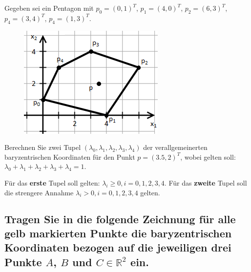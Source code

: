 \documentclass[a4paper,10pt,DIV=14]{scrartcl}
\begin{document}
Gegeben sei ein Pentagon mit $p_0 = (0, 1)^T$, $p_1 = (4, 0)^T$, $p_2 = (6, 3)^T$, $p_4 = (3, 4)^T$, $p_4 = (1, 3)^T$.
\begin{figure}[!htbp]
	\centering
	\includegraphics[]{simplex}
\end{figure}

Berechnen Sie zwei Tupel $(\lambda_0, \lambda_1, \lambda_2, \lambda_3, \lambda_4)$ der verallgemeinerten baryzentrischen Koordinaten für den Punkt $p = (3.5, 2)^T$, wobei gelten soll: $\lambda_0 + \lambda_1 + \lambda_2 + \lambda_3 + \lambda_4 = 1$.

Für das \textbf{erste} Tupel soll gelten: $\lambda_i \geq 0, i = 0,1,2,3,4$.
Für das \textbf{zweite} Tupel soll die strengere Annahme $\lambda_i > 0, i = 0,1,2,3,4$ gelten.


\subsection{Tragen Sie in die folgende Zeichnung für alle gelb markierten Punkte die baryzentrischen Koordinaten bezogen auf die jeweiligen drei Punkte $A$, $B$ und $C \in \mathbb{R}^2$ ein.}
\end{document}
